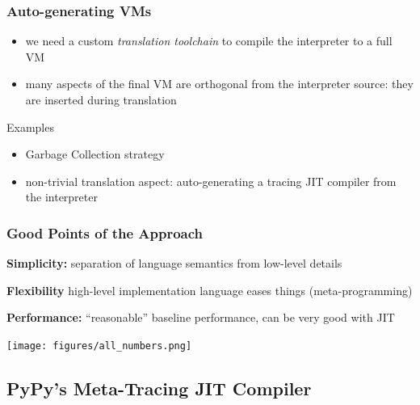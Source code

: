 \documentclass[utf8x]{beamer}
\begin{document}
\begin{frame}
  \frametitle{Auto-generating VMs}
  \begin{itemize}
  \item we need a custom \emph{translation toolchain} to compile the interpreter
    to a full VM
  \item many aspects of the final VM are orthogonal from the interpreter source:
    they are inserted during translation
  \end{itemize}
  \pause
  \begin{block}{
    Examples}
    \begin{itemize}
    \item Garbage Collection strategy
    \item non-trivial translation aspect: auto-generating a tracing JIT compiler from
      the interpreter
    \end{itemize}
  \end{block}
\end{frame}


\begin{frame}
  \frametitle{Good Points of the Approach}
  {\bf Simplicity:} separation of language semantics from low-level details
  \pause

  {\bf Flexibility} high-level implementation language eases things (meta-programming)
  \pause

  {\bf Performance:} ``reasonable'' baseline performance, can be very good with JIT
\end{frame}


\begin{frame}[plain]
  \texttt{[image: figures/all\_numbers.png]}
\end{frame}

\subsection{PyPy's Meta-Tracing JIT Compiler}

%
\end{document}
